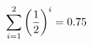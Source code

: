 \documentclass[preview]{standalone}
\begin{document}
\begin{align*}
\sum_{i=1}^{ 2 } \left({ 1 } \over {2} \right)^i = { 0.75 }
\end{align*}
\end{document}
